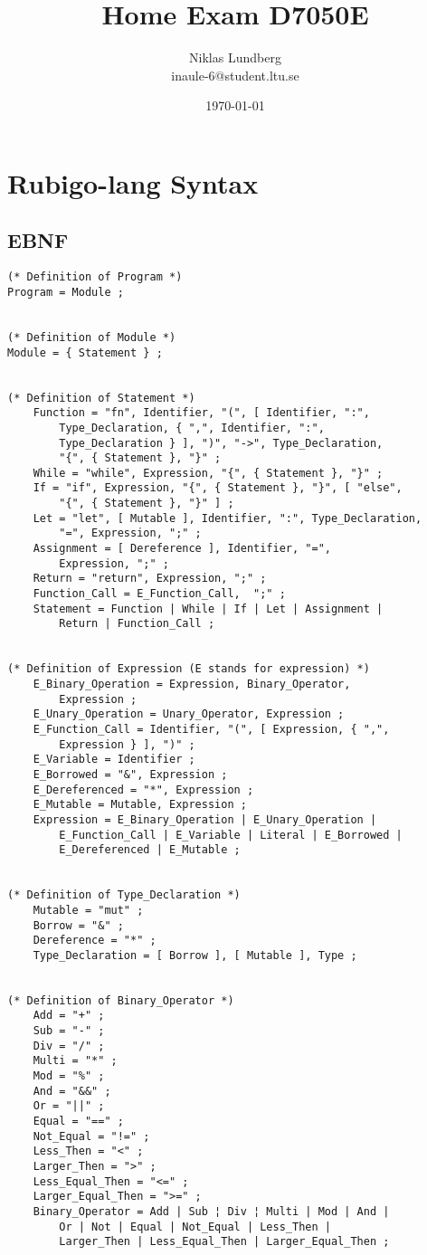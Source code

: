 \documentclass[12pt]{article}
\title{Home Exam D7050E}
\author{Niklas Lundberg \\ inaule-6@student.ltu.se}
\date{\today}
\begin{document}
    \maketitle
    \newpage
	
    \section{Rubigo-lang Syntax}
    \subsection{EBNF}
    	\begin{verbatim}
(* Definition of Program *)
Program = Module ;


(* Definition of Module *)
Module = { Statement } ;


(* Definition of Statement *)
    Function = "fn", Identifier, "(", [ Identifier, ":",
        Type_Declaration, { ",", Identifier, ":", 
        Type_Declaration } ], ")", "->", Type_Declaration,
        "{", { Statement }, "}" ;
    While = "while", Expression, "{", { Statement }, "}" ;
    If = "if", Expression, "{", { Statement }, "}", [ "else",
        "{", { Statement }, "}" ] ;
    Let = "let", [ Mutable ], Identifier, ":", Type_Declaration,
        "=", Expression, ";" ;
    Assignment = [ Dereference ], Identifier, "=",
        Expression, ";" ;
    Return = "return", Expression, ";" ;
    Function_Call = E_Function_Call,  ";" ;
    Statement = Function | While | If | Let | Assignment |
        Return | Function_Call ;


(* Definition of Expression (E stands for expression) *)
    E_Binary_Operation = Expression, Binary_Operator,
        Expression ;
    E_Unary_Operation = Unary_Operator, Expression ;
    E_Function_Call = Identifier, "(", [ Expression, { ",",
        Expression } ], ")" ;
    E_Variable = Identifier ;
    E_Borrowed = "&", Expression ;
    E_Dereferenced = "*", Expression ;
    E_Mutable = Mutable, Expression ;
    Expression = E_Binary_Operation | E_Unary_Operation |
        E_Function_Call | E_Variable | Literal | E_Borrowed |
        E_Dereferenced | E_Mutable ; 


(* Definition of Type_Declaration *)
    Mutable = "mut" ;
    Borrow = "&" ;
    Dereference = "*" ;
    Type_Declaration = [ Borrow ], [ Mutable ], Type ;


(* Definition of Binary_Operator *)
    Add = "+" ;
    Sub = "-" ;
    Div = "/" ;
    Multi = "*" ;
    Mod = "%" ;
    And = "&&" ;
    Or = "||" ;
    Equal = "==" ;
    Not_Equal = "!=" ;
    Less_Then = "<" ;
    Larger_Then = ">" ;
    Less_Equal_Then = "<=" ;
    Larger_Equal_Then = ">=" ;
    Binary_Operator = Add | Sub ¦ Div ¦ Multi | Mod | And |
        Or | Not | Equal | Not_Equal | Less_Then |
        Larger_Then | Less_Equal_Then | Larger_Equal_Then ;



\end{verbatim}
\end{document}
